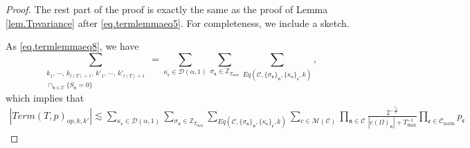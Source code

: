 \begin{proof}
The rest part of the proof is exactly the same as the proof of Lemma \ref{lem.Tpvariance} after \eqref{eq.termlemmaeq5}. For completeness, we include a sketch.

As \eqref{eq.termlemmaeq8}, we have  
\begin{equation}
    \sum_{\substack{k_1,\, \cdots,\, k_{l(T)+1},\, k'_1,\, \cdots,\, k'_{l(T)+1}\\\cap_{\mathfrak{n}\in \mathcal{C}} \{S_{\mathfrak{n}}=0\}}}=\sum_{\kappa_{\mathfrak{e}}\in \mathcal{D}(\alpha,1)}\sum_{\sigma_{\mathfrak{n}}\in \mathbb{Z}_{T_{\text{max}}}}\sum_{Eq(\mathcal{C}, \{\sigma_{\mathfrak{n}}\}_{\mathfrak{n}}, \{\kappa_{\mathfrak{e}}\}_{\mathfrak{e}},k)},
\end{equation}
which implies that
\begin{equation}\label{eq.termlemmaeq6op}
\begin{split}
    |Term(T, p)_{op,k,k'}|\lesssim \sum_{\kappa_{\mathfrak{e}}\in \mathcal{D}(\alpha,1)}\sum_{\sigma_{\mathfrak{n}}\in \mathbb{Z}_{T_{\text{max}}}}\sum_{Eq(\mathcal{C}, \{\sigma_{\mathfrak{n}}\}_{\mathfrak{n}}, \{\kappa_{\mathfrak{e}}\}_{\mathfrak{e}},k)} \sum_{c\in \mathscr{M}(\mathcal{C}) }\prod_{\mathfrak{n}\in \mathcal{C}}\frac{2^{-\frac{\tau_{\mathfrak{n}}}{2}}}{|c(\Omega)_{\mathfrak{n}}|+T^{-1}_{\text{max}}} \prod_{\mathfrak{e}\in \mathcal{C}_{\text{norm}}} p_{\mathfrak{e}}
\end{split}
\end{equation}



\end{proof}

